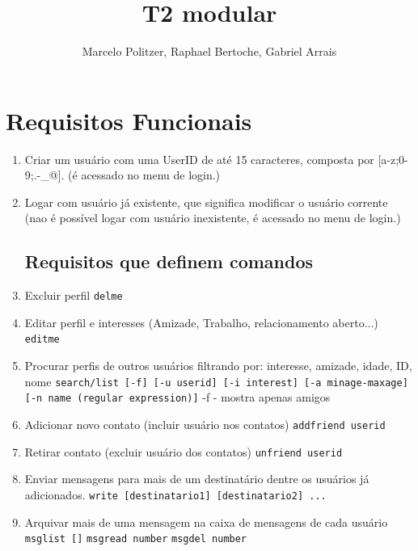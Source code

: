 \documentclass[a4paper,8pt]{article}
\title{T2 modular}
\author{Marcelo Politzer, Raphael Bertoche, Gabriel Arrais}
\begin{document}
\maketitle

\section{Requisitos Funcionais}


\begin{enumerate}
\item Criar um usuário com uma UserID de até 15 caracteres, composta por
[a-z;0-9;.-\_@]. (é acessado no menu de login.)

\item Logar com usuário já existente, que significa modificar o usuário
 corrente (nao é possível logar com usuário inexistente, é acessado no menu
 de login.)

\subsection{Requisitos que definem comandos}
\item Excluir perfil
 \newline\texttt{delme}

\item Editar perfil e interesses (Amizade, Trabalho, relacionamento aberto...)
\newline\texttt{editme}

\item Procurar perfis de outros usuários filtrando por: interesse, amizade,
 idade, ID, nome
 \newline\texttt{search/list [-f] [-u userid] [-i interest] [-a minage-maxage]
 [-n name (regular expression)]}
 \newline-f - mostra apenas amigos

\item Adicionar novo contato (incluir usuário nos contatos)
 \newline\texttt{addfriend userid}

\item Retirar contato (excluir usuário dos contatos)
 \newline\texttt{unfriend userid}

\item Enviar mensagens para mais de um destinatário dentre os usuários já
 adicionados.
 \newline\texttt{write [destinatario1] [destinatario2] ...}

\item Arquivar mais de uma mensagem na caixa de mensagens de cada usuário
 \newline\texttt{msglist []}
 \newline\texttt{msgread number}
 \newline\texttt{msgdel number}

\end{enumerate}
\end{document}

